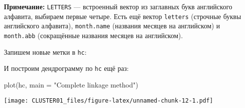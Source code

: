 \documentclass[
]{article}
\newenvironment{Shaded}{\begin{snugshade}}{\end{snugshade}}
\newcommand{\AttributeTok}[1]{\textcolor[rgb]{0.77,0.63,0.00}{#1}}
\newcommand{\FunctionTok}[1]{\textcolor[rgb]{0.00,0.00,0.00}{#1}}
\newcommand{\NormalTok}[1]{#1}
\newcommand{\OtherTok}[1]{\textcolor[rgb]{0.56,0.35,0.01}{#1}}
\newcommand{\SpecialCharTok}[1]{\textcolor[rgb]{0.00,0.00,0.00}{#1}}
\newcommand{\StringTok}[1]{\textcolor[rgb]{0.31,0.60,0.02}{#1}}
\begin{document}
\textbf{Примечание:} \texttt{LETTERS} --- встроенный вектор из заглавных
букв английского алфавита, выбираем первые четыре. Есть ещё вектор
\texttt{letters} (строчные буквы английского алфавита),
\texttt{month.name} (названия месяцев на английском) и
\texttt{month.abb} (сокращённые названия месяцев на английском).

Запишем новые метки в \texttt{hc}:

\begin{Shaded}
\end{Shaded}

И построим дендрограмму по \texttt{hc} ещё раз:

\begin{Shaded}
\begin{Highlighting}[]
\FunctionTok{plot}\NormalTok{(hc, }\AttributeTok{main =} \StringTok{"Complete linkage method"}\NormalTok{)}
\end{Highlighting}
\end{Shaded}

\texttt{[image: CLUSTER01\_files/figure-latex/unnamed-chunk-12-1.pdf]}
\end{document}
